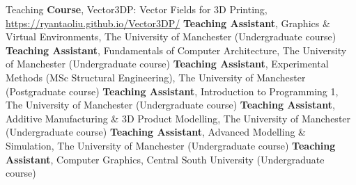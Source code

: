 \begin{rubric}{Teaching}
%
	\textbf{Course}, Vector3DP: Vector Fields for 3D Printing, \href{https://ryantaoliu.github.io/Vector3DP/}{https://ryantaoliu.github.io/Vector3DP/}
%
\entry*[September 2025]%
	\textbf{Teaching Assistant}, Graphics \& Virtual Environments, The University of Manchester (Undergraduate course)
%
\entry*[September 2025]%
	\textbf{Teaching Assistant}, Fundamentals of Computer Architecture, The University of Manchester (Undergraduate course)
%
\entry*[September 2025]%
	\textbf{Teaching Assistant}, Experimental Methods (MSc Structural Engineering), The University of Manchester (Postgraduate course)
%
\entry*[September 2024]%
	\textbf{Teaching Assistant}, Introduction to Programming 1, The University of Manchester (Undergraduate course)
%
\entry*[September 2023]%
	\textbf{Teaching Assistant}, Additive Manufacturing \& 3D Product Modelling, The University of Manchester (Undergraduate course)
%
\entry*[September 2023]%
	\textbf{Teaching Assistant}, Advanced Modelling \& Simulation, The University of Manchester (Undergraduate course)
%
\entry*[September 2018]%
	\textbf{Teaching Assistant}, Computer Graphics, Central South University (Undergraduate course)
%
\end{rubric}
